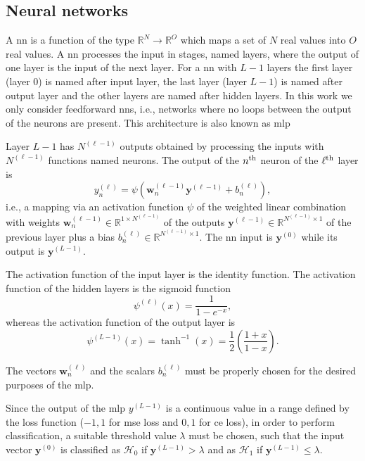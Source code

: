 \documentclass[draftcls,onecolumn,12pt]{IEEEtran}
\begin{document}
\subsection{Neural networks}\label{sec:nn}

A \ac{nn} is a function of the type $\mathbb{R}^N \to \mathbb{R}^O$ which maps a set of $N$ real values into $O$ real values. A \ac{nn} processes the input in stages, named layers, where the output of one layer is the input of the next layer. For a \ac{nn} with $L-1$ layers the first layer (layer $0$) is named after input layer, the last layer (layer $L-1$) is named after output layer and the other layers are named after hidden layers. In this work we only consider feedforward \acp{nn}, i.e., networks where no loops between the output of the neurons are present. This architecture is also known as \ac{mlp}

Layer $L-1$ has $N^{(\ell-1)}$ outputs obtained by processing the inputs with $N^{(\ell-1)}$ functions named neurons. The output of the $n^{\rm th}$ neuron of the $\ell^{\rm th}$ layer is
\begin{equation}\label{eq:nonLin}
y_n^{(\ell)} = \psi\left( \bm{w}_n^{(\ell -1)}\bm{y}^{(\ell-1)}+b_n^{(\ell)} \right),
\end{equation}
i.e., a mapping via an activation function $\psi$ of the weighted linear combination with weights $\bm{w}_n^{(\ell -1)}\in \mathbb{R}^{1\times N^{(\ell-1)}}$ of the outputs $\bm{y}^{(\ell-1)} \in \mathbb{R}^{N^{(\ell-1)} \times 1 }$ of the previous layer plus a bias $b_n^{(\ell)} \in \mathbb{R}^{N^{(\ell-1)} \times 1 }$. The \ac{nn} input is $\bm{y}^{(0)}$ while its output is $\bm{y}^{(L-1)}$. 

The activation function of the input layer is the identity function. The activation function of the hidden layers is the sigmoid function
\begin{equation}
\psi^{(\ell)}(x) = \frac{1}{1-e^{-x}},
\end{equation}
whereas the activation function of the output layer is 
\begin{equation}
\psi^{(L-1)}(x)=\tanh^{-1}(x) = \frac{1}{2} \left( \frac{1+x}{1-x} \right).
\end{equation}


The vectors $\bm{w}_n^{(\ell)}$ and the scalars $b_n^{(\ell)}$ must be properly chosen for the desired purposes of the \ac{mlp}.

Since the output of the \ac{mlp} $y^{(L-1)}$ is a continuous value in a range defined by the loss function (${-1,1}$ for \ac{mse} loss and ${0,1}$ for \ac{ce} loss), in order to perform classification, a suitable threshold value $\lambda$ must be chosen, such that the input vector $\bm{y}^{(0)}$ is classified as
$\mathcal{H}_0$ if $\bm{y}^{(L-1)} > \lambda$ and as $\mathcal{H}_1$ if $\bm{y}^{(L-1)} \le \lambda$.
\end{document}
